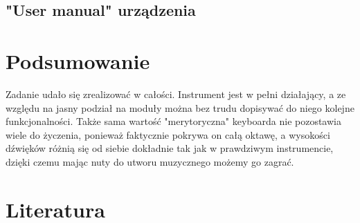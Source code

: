 \documentclass[a4paper,11pt]{article}
\begin{document}
\subsection{"User manual" urządzenia}

\section{Podsumowanie}
Zadanie udało się zrealizować w całości. Instrument jest w pełni działający, a ze względu na jasny podział na moduły można bez trudu dopisywać do niego kolejne funkcjonalności. Także sama wartość "merytoryczna" keyboarda nie pozostawia wiele do życzenia, ponieważ faktycznie pokrywa on całą oktawę, a wysokości dźwięków różnią się od siebie dokładnie tak jak w prawdziwym instrumencie, dzięki czemu mając nuty do utworu muzycznego możemy go zagrać.

\section{Literatura}
\end{document}
